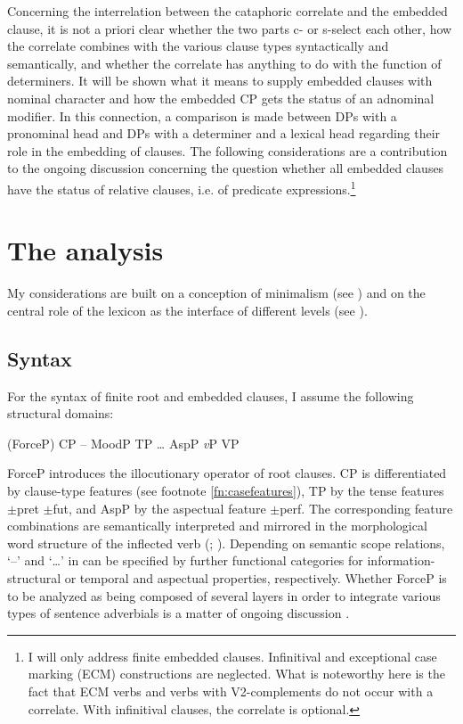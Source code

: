 \documentclass[output=paper]{langscibook}
\begin{document}
Concerning the interrelation between the cataphoric correlate and the embedded clause, it is not a priori clear whether the two parts c- or s-select each other, how the correlate combines with the various clause types syntactically and semantically, and whether the correlate has anything to do with the function of determiners. It will be shown what it means to supply embedded clauses with nominal character and how the embedded CP gets the status of an adnominal modifier. In this connection, a comparison is made between DPs with a pronominal head and DPs with a determiner and a lexical head regarding their role in the embedding of clauses. The following considerations are a contribution to the ongoing discussion concerning the question whether all embedded clauses have the status of relative clauses, i.e. of predicate expressions.\footnote{I will only address finite embedded clauses. Infinitival and exceptional case marking (ECM) constructions are neglected. What is noteworthy here is the fact that ECM verbs and verbs with V2-complements do not occur with a correlate. With infinitival clauses, the correlate is optional.}


\section{The analysis}\label{s:2}

My considerations are built on a conception of minimalism (see \citealt{Chomsky1995,Chomsky2001}) and on the central role of the lexicon as the interface of different levels (see \citealt{Zimmermann1987,JackendoffAudrintoappear}).


\subsection{Syntax}\label{s:2.1}
For the syntax of finite root and embedded clauses, I assume the following structural domains:

\ea\label{ex:zimmermann:6} (ForceP) CP -- MoodP TP {\dots} AspP \textit{v}P VP \z

\noindent ForceP introduces the illocutionary operator of root clauses. CP is differentiated by clause-type features (see footnote \ref{fn:casefeatures}), TP by the tense features $\pm$pret $\pm$fut, and AspP by the aspectual feature $\pm$perf. The corresponding feature combinations are semantically interpreted and mirrored in the morphological word structure of the inflected verb (\citealt{Zimmermann1990,Zimmermann2013}; \citealt{Pitsch2014a,Pitsch2014b}). Depending on semantic scope relations, `--' and `{\dots}' in  can be specified by further functional categories for information-structural or temporal and aspectual properties, respectively. Whether ForceP is to be analyzed as being composed of several layers in order to integrate various types of sentence adverbials is a matter of ongoing discussion \citep[see, a.o.,][]{Krifka2021}.
\end{document}
